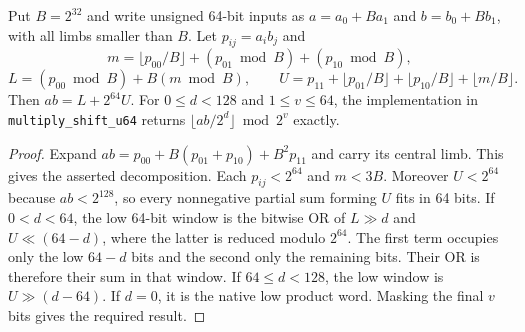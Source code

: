 \begin{lemma}
Put $B=2^{32}$ and write unsigned 64-bit inputs as $a=a_0+Ba_1$ and
$b=b_0+Bb_1$, with all limbs smaller than $B$. Let $p_{ij}=a_i b_j$ and
\[
 m=\lfloor p_{00}/B\rfloor+(p_{01}\bmod B)+(p_{10}\bmod B),
\]
\[
 L=(p_{00}\bmod B)+B(m\bmod B),\qquad
 U=p_{11}+\lfloor p_{01}/B\rfloor+\lfloor p_{10}/B\rfloor
       +\lfloor m/B\rfloor .
\]
Then $ab=L+2^{64}U$. For $0\leq d<128$ and $1\leq v\leq64$, the
implementation in \texttt{multiply\_shift\_u64} returns
$\lfloor ab/2^d\rfloor\bmod2^v$ exactly.
\end{lemma}
\begin{proof}
Expand $ab=p_{00}+B(p_{01}+p_{10})+B^2p_{11}$ and carry its central limb.
This gives the asserted decomposition. Each $p_{ij}<2^{64}$ and $m<3B$.
Moreover $U<2^{64}$ because $ab<2^{128}$, so every nonnegative partial sum
forming $U$ fits in 64 bits. If $0<d<64$, the low 64-bit window is the bitwise
OR of $L\gg d$ and $U\ll(64-d)$, where the latter is reduced modulo
$2^{64}$. The first term occupies only the low $64-d$ bits and the second
only the remaining bits. Their OR is therefore their sum in that window.
If $64\leq d<128$, the low window is $U\gg(d-64)$. If $d=0$, it is the
native low product word. Masking the final $v$ bits gives the required result.
\end{proof}


